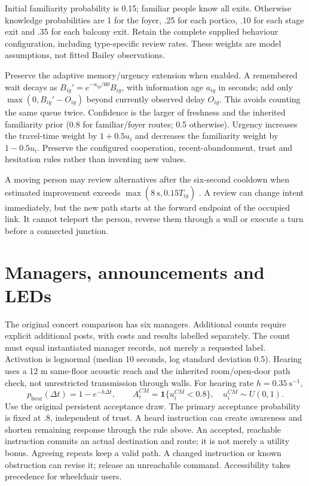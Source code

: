 \documentclass[11pt,a4paper]{article}
\newcommand{\ind}{\mathbf{1}}
\begin{document}
Initial familiarity probability is 0.15; familiar people know all exits. Otherwise knowledge probabilities are 1 for the foyer, .25 for each portico, .10 for each stage exit and .35 for each balcony exit. Retain the complete supplied behaviour configuration, including type-specific review rates. These weights are model assumptions, not fitted Bailey observations.

Preserve the adaptive memory/urgency extension when enabled. A remembered wait decays as $B_{ig}'=e^{-a_{ig}/60}B_{ig}$, with information age $a_{ig}$ in seconds; add only $\max(0,B_{ig}'-O_{ig})$ beyond currently observed delay $O_{ig}$. This avoids counting the same queue twice. Confidence is the larger of freshness and the inherited familiarity prior (0.8 for familiar/foyer routes; 0.5 otherwise). Urgency increases the travel-time weight by $1+0.5u_i$ and decreases the familiarity weight by $1-0.5u_i$. Preserve the configured cooperation, recent-abandonment, trust and hesitation rules rather than inventing new values.

A moving person may review alternatives after the six-second cooldown when estimated improvement exceeds $\max(8\ \mathrm{s},0.15\widehat T_{ig})$ \cite{liao}. A review can change intent immediately, but the new path starts at the forward endpoint of the occupied link. It cannot teleport the person, reverse them through a wall or execute a turn before a connected junction.

\section{Managers, announcements and LEDs}

The original concert comparison has six managers. Additional counts require explicit additional posts, with costs and results labelled separately. The count must equal instantiated manager records, not merely a requested label. Activation is lognormal (median 10 seconds, log standard deviation 0.5). Hearing uses a 12 m same-floor acoustic reach and the inherited room/open-door path check, not unrestricted transmission through walls. For hearing rate $h=0.35\ \mathrm{s}^{-1}$,
\begin{equation}\label{impl:eq17}
 p_{\mathrm{hear}}(\Delta t)=1-e^{-h\Delta t},\qquad
 A_i^{CM}=\ind\{u_i^{CM}<0.8\},\quad u_i^{CM}\sim U(0,1).
\end{equation}
Use the original persistent acceptance draw. The primary acceptance probability is fixed at .8, independent of trust. A heard instruction can create awareness and shorten remaining response through the rule above. An accepted, reachable instruction commits an actual destination and route; it is not merely a utility bonus. Agreeing repeats keep a valid path. A changed instruction or known obstruction can revise it; release an unreachable command. Accessibility takes precedence for wheelchair users.
\end{document}

